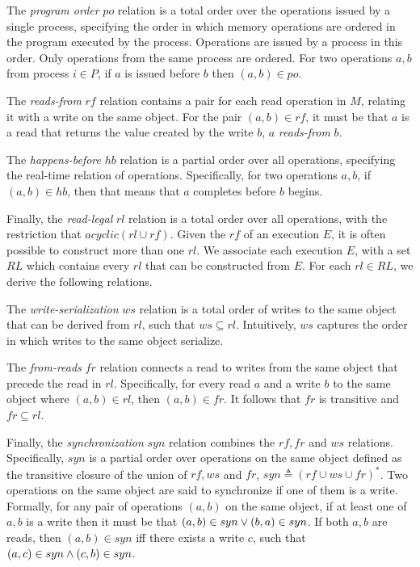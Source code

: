 The \emph{program order} $po$ relation is a total order over the operations issued by a single process, specifying the order in which memory operations are ordered in the program executed by the process. Operations are issued by a process in this order. Only operations from the same process are ordered. For two operations $a, b$ from process $i \in P$,  if $a$ is issued before $b$ then $(a, b) \in po$. 


\custvspace\noindent
The \emph{reads-from} $rf$ relation contains a pair for each read operation in $M$, relating it with a write on the same object.
For the pair $(a, b) \in rf$, it must be that $a$ is a read that returns the value created by the write $b$, \ie $a$ \emph{reads-from} $b$.

\custvspace\noindent
The \emph{happens-before} $hb$ relation is a partial order over all operations, specifying the real-time relation of operations.
Specifically, for two operations $a, b$, if $(a, b) \in hb$, then that means that $a$ completes before $b$ begins. %

\custvspace\noindent
Finally, the \emph{read-legal} $rl$ relation is a total order over all operations, with the restriction that $acyclic(rl \cup rf)$.
Given the $rf$ of an execution $E$, it is often possible to construct more than one $rl$. We associate each execution $E$, with a set $RL$ which contains every $rl$ that can be constructed from $E$. 
For each $rl \in RL$, we derive the following relations.

The \emph{write-se\-riali\-za\-tion} $ws$ relation is a total order of writes to the same object that can be derived from $rl$, such that $ws \subseteq rl$. Intuitively, $ws$ captures the order in which writes to the same object serialize.

\custvspace\noindent
The \emph{from-reads} $fr$ relation connects a read to writes from the same object that precede the read in $rl$. Specifically, for every read $a$ and a write $b$ to the same object where $(a, b) \in rl$, then  $(a, b) \in fr$.
It follows that $fr$ is transitive and $fr \subseteq rl$. 

\custvspace\noindent
Finally, the \emph{synchronization} $syn$ relation combines the $rf, fr$ and $ws$ relations. Specifically, $syn$ is a partial order over operations on the same object defined as the transitive closure of the union of $rf, ws$ and $fr$, \ie $syn \triangleq (rf \cup ws \cup fr)^\ast$. 
Two operations on the same object are said to synchronize if one of them is a write. Formally, for any pair of operations $(a, b)$ on the same object, if at least one of $a, b$ is a write then it must be that $(a, b) \in syn \vee (b,a) \in syn$. If both $a, b$ are reads, then $(a, b) \in syn$ iff there exists a write $c$, such that $(a,c) \in syn \wedge (c, b) \in syn$.


